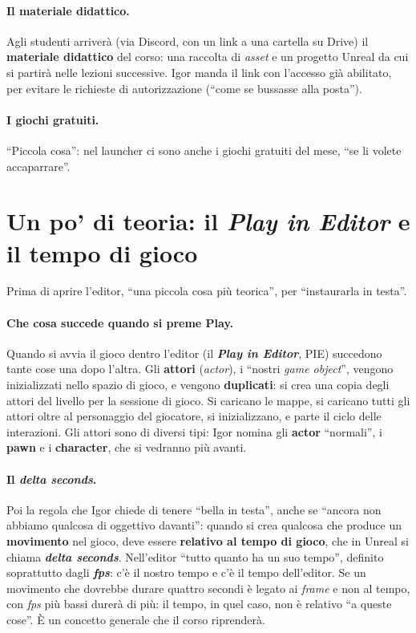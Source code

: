 \paragraph{Il materiale didattico.} Agli studenti arriverà (via Discord, con un link a una
cartella su Drive) il \textbf{materiale didattico} del corso: una raccolta di
\emph{asset} e un progetto Unreal da cui si partirà nelle lezioni successive. Igor
manda il link con l'accesso già abilitato, per evitare le richieste di autorizzazione
(``come se bussasse alla posta'').

\paragraph{I giochi gratuiti.} ``Piccola cosa'': nel launcher ci sono anche i giochi
gratuiti del mese, ``se li volete accaparrare''.

\section{Un po' di teoria: il \emph{Play in Editor} e il tempo di gioco}
\label{ue1:sec:pie}

Prima di aprire l'editor, ``una piccola cosa più teorica'', per ``instaurarla in
testa''.

\paragraph{Che cosa succede quando si preme Play.} Quando si avvia il gioco dentro
l'editor (il \textbf{\emph{Play in Editor}}, PIE) succedono tante cose una dopo
l'altra. Gli \textbf{attori} (\emph{actor}), i ``nostri \emph{game object}'', vengono
inizializzati nello spazio di gioco, e vengono \textbf{duplicati}: si crea una copia
degli attori del livello per la sessione di gioco. Si caricano le mappe, si caricano
tutti gli attori oltre al personaggio del giocatore, si inizializzano, e parte il ciclo
delle interazioni. Gli attori sono di diversi tipi: Igor nomina gli \textbf{actor}
``normali'', i \textbf{pawn} e i \textbf{character}, che si vedranno più avanti.

\paragraph{Il \emph{delta seconds}.} Poi la regola che Igor chiede di tenere ``bella in
testa'', anche se ``ancora non abbiamo qualcosa di oggettivo davanti'': quando si crea
qualcosa che produce un \textbf{movimento} nel gioco, deve essere \textbf{relativo al
tempo di gioco}, che in Unreal si chiama \textbf{\emph{delta seconds}}. Nell'editor
``tutto quanto ha un suo tempo'', definito soprattutto dagli \textbf{\emph{fps}}: c'è il
nostro tempo e c'è il tempo dell'editor. Se un movimento che dovrebbe durare quattro
secondi è legato ai \emph{frame} e non al tempo, con \emph{fps} più bassi durerà di più:
il tempo, in quel caso, non è relativo ``a queste cose''. È un concetto generale che il
corso riprenderà.


